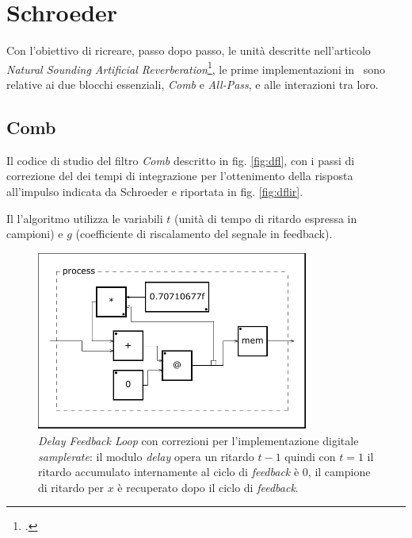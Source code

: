 \section{Schroeder}

Con l’obiettivo di ricreare, passo dopo passo, le unità descritte nell’articolo
\emph{Natural Sounding Artificial Reverberation}\footcite{ms:rev62}, le prime
implementazioni in \faust~sono relative ai due blocchi essenziali, \emph{Comb}
e \emph{All-Pass}, e alle interazioni tra loro.

\subsection{Comb}

Il codice di studio del filtro \emph{Comb} descritto in fig. \ref{fig:dfl}, con
i passi di correzione del dei tempi di integrazione per l'ottenimento della
risposta all'impulso indicata da Schroeder e riportata in fig. \ref{fig:dflir}.




Il l'algoritmo utilizza le variabili $t$ (unità di tempo di ritardo espressa in
campioni) e $g$ (coefficiente di riscalamento del segnale in feedback).

\begin{figure}[htp]
\centering
\includegraphics[width=0.80\textwidth]{Code/dflc-svg/process.pdf}
\caption{\emph{Delay Feedback Loop} con correzioni per l'implementazione
         digitale \emph{samplerate}: il modulo \emph{delay} opera un ritardo
         $t-1$ quindi con $t=1$ il ritardo accumulato internamente al ciclo di
         \emph{feedback} è $0$, il campione di ritardo per $x$ è recuperato dopo
         il ciclo di \emph{feedback}.}
\label{fig:dflfaust}
\end{figure}

